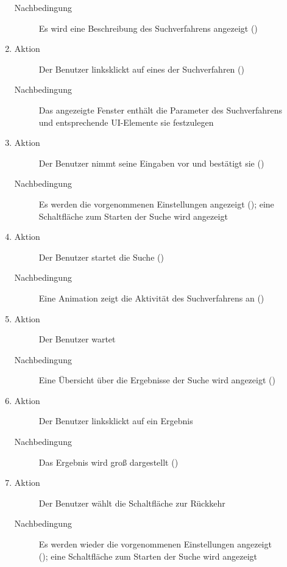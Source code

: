 \begin{description}
\begin{enumerate}
\begin{description}
			\item[Nachbedingung] Es wird eine Beschreibung des Suchverfahrens angezeigt ()
		\end{description}
		\item
		\begin{description}
			\item[Aktion] Der Benutzer linksklickt auf eines der Suchverfahren ()
			\item[Nachbedingung] Das angezeigte Fenster enthält die Parameter des Suchverfahrens und entsprechende UI-Elemente sie festzulegen
		\end{description}
		\item
		\begin{description}
			\item[Aktion] Der Benutzer nimmt seine Eingaben vor und bestätigt sie ()
			\item[Nachbedingung] Es werden die vorgenommenen Einstellungen angezeigt (); eine Schaltfläche zum Starten der Suche wird angezeigt
		\end{description}
		\item
		\begin{description}
			\item[Aktion] Der Benutzer startet die Suche ()
			\item[Nachbedingung] Eine Animation zeigt die Aktivität des Suchverfahrens an ()
		\end{description}
		\item
		\begin{description}
			\item[Aktion] Der Benutzer wartet
			\item[Nachbedingung] Eine Übersicht über die Ergebnisse der Suche wird angezeigt ()
		\end{description}
		\item
		\begin{description}
			\item[Aktion] Der Benutzer linksklickt auf ein Ergebnis
			\item[Nachbedingung] Das Ergebnis wird groß dargestellt ()
		\end{description}
		\item
		\begin{description}
			\item[Aktion] Der Benutzer wählt die Schaltfläche zur Rückkehr
			\item[Nachbedingung] Es werden wieder die vorgenommenen Einstellungen angezeigt (); eine Schaltfläche zum Starten der Suche wird angezeigt

\end{description}
\end{enumerate}
\end{description}
